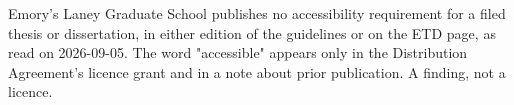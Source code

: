 

	{Emory's Laney Graduate School publishes no accessibility requirement for a
	 filed thesis or dissertation, in either edition of the guidelines or on the
	 ETD page, as read on 2026-09-05. The word "accessible" appears only in the
	 Distribution Agreement's licence grant and in a note about prior
	 publication. A finding, not a licence.}

